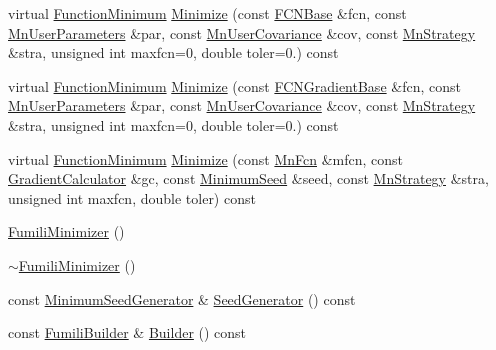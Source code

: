 \begin{DoxyCompactItemize}
virtual \mbox{\hyperlink{classROOT_1_1Minuit2_1_1FunctionMinimum}{Function\+Minimum}} \mbox{\hyperlink{classROOT_1_1Minuit2_1_1FumiliMinimizer_a954728eb57315bb43039fe2ba71f4098}{Minimize}} (const \mbox{\hyperlink{classROOT_1_1Minuit2_1_1FCNBase}{F\+C\+N\+Base}} \&fcn, const \mbox{\hyperlink{classROOT_1_1Minuit2_1_1MnUserParameters}{Mn\+User\+Parameters}} \&par, const \mbox{\hyperlink{classROOT_1_1Minuit2_1_1MnUserCovariance}{Mn\+User\+Covariance}} \&cov, const \mbox{\hyperlink{classROOT_1_1Minuit2_1_1MnStrategy}{Mn\+Strategy}} \&stra, unsigned int maxfcn=0, double toler=0.) const
\item 
virtual \mbox{\hyperlink{classROOT_1_1Minuit2_1_1FunctionMinimum}{Function\+Minimum}} \mbox{\hyperlink{classROOT_1_1Minuit2_1_1FumiliMinimizer_adb2739d40e10cce1923e5a21dac3f420}{Minimize}} (const \mbox{\hyperlink{classROOT_1_1Minuit2_1_1FCNGradientBase}{F\+C\+N\+Gradient\+Base}} \&fcn, const \mbox{\hyperlink{classROOT_1_1Minuit2_1_1MnUserParameters}{Mn\+User\+Parameters}} \&par, const \mbox{\hyperlink{classROOT_1_1Minuit2_1_1MnUserCovariance}{Mn\+User\+Covariance}} \&cov, const \mbox{\hyperlink{classROOT_1_1Minuit2_1_1MnStrategy}{Mn\+Strategy}} \&stra, unsigned int maxfcn=0, double toler=0.) const
\item 
virtual \mbox{\hyperlink{classROOT_1_1Minuit2_1_1FunctionMinimum}{Function\+Minimum}} \mbox{\hyperlink{classROOT_1_1Minuit2_1_1FumiliMinimizer_ace396e586a17ad934f18b32c8ddd054a}{Minimize}} (const \mbox{\hyperlink{classROOT_1_1Minuit2_1_1MnFcn}{Mn\+Fcn}} \&mfcn, const \mbox{\hyperlink{classROOT_1_1Minuit2_1_1GradientCalculator}{Gradient\+Calculator}} \&gc, const \mbox{\hyperlink{classROOT_1_1Minuit2_1_1MinimumSeed}{Minimum\+Seed}} \&seed, const \mbox{\hyperlink{classROOT_1_1Minuit2_1_1MnStrategy}{Mn\+Strategy}} \&stra, unsigned int maxfcn, double toler) const
\item 
\mbox{\hyperlink{classROOT_1_1Minuit2_1_1FumiliMinimizer_af33036073afd0161dbe9fd2fe0866575}{Fumili\+Minimizer}} ()
\item 
\mbox{\hyperlink{classROOT_1_1Minuit2_1_1FumiliMinimizer_a2e482171de26d153b98228aa41adee3e}{$\sim$\+Fumili\+Minimizer}} ()
\item 
const \mbox{\hyperlink{classROOT_1_1Minuit2_1_1MinimumSeedGenerator}{Minimum\+Seed\+Generator}} \& \mbox{\hyperlink{classROOT_1_1Minuit2_1_1FumiliMinimizer_ad8906dbac7f0c20284e361be606d5634}{Seed\+Generator}} () const
\item 
const \mbox{\hyperlink{classROOT_1_1Minuit2_1_1FumiliBuilder}{Fumili\+Builder}} \& \mbox{\hyperlink{classROOT_1_1Minuit2_1_1FumiliMinimizer_a24d20e7cd4a335f60616fd7cafe0739c}{Builder}} () const

\end{DoxyCompactItemize}
